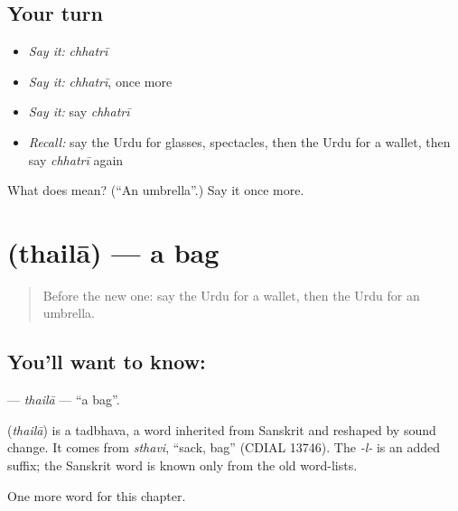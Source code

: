 \subsection*{Your turn}
\begin{itemize}
\raggedright
  \item \emph{Say it:} \emph{chhatrī}
  \item \emph{Say it:} \emph{chhatrī}, once more
  \item \emph{Say it:} say \emph{chhatrī}
  \item \emph{Recall:} say the Urdu for glasses, spectacles, then the Urdu for a wallet, then say \emph{chhatrī} again
\end{itemize}

\begin{tcolorbox}[breakable,colback=teal!4,colframe=teal!35!black,title={Before you move on}]
What does  mean? (\textquotedblleft{}An umbrella\textquotedblright{}.) Say it once more.
\end{tcolorbox}
\section[\texorpdfstring{\ur{تھیلا} (thailā)}{تھیلا (thailā)}]{ (thailā) — a bag}

\label{lesson:UR-C111-thaila}



\begin{quote}
Before the new one: say the Urdu for a wallet, then the Urdu for an umbrella.
\end{quote}

\subsection*{You'll want to know: }
\textbf{} — \emph{thailā} — \textquotedblleft{}a bag\textquotedblright{}.

\begin{cousinweb}
\textbf{} (\emph{thailā}) is a tadbhava, a word inherited from Sanskrit and reshaped by sound change. It comes from \emph{sthavi}, \textquotedblleft{}sack, bag\textquotedblright{} (CDIAL 13746). The \emph{-l-} is an added suffix; the Sanskrit word is known only from the old word-lists.
\end{cousinweb}

\begin{grammarlens}[title={What you've built}]
One more word for this chapter.
\end{grammarlens}

